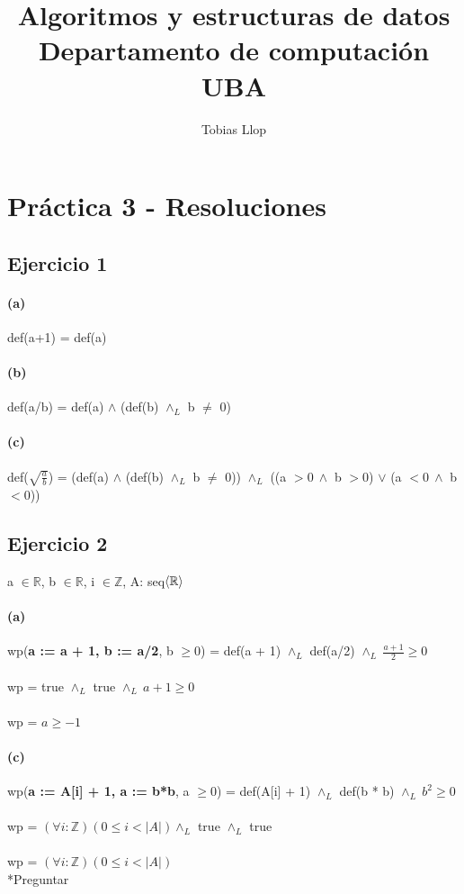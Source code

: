 \documentclass{article}
\title{Algoritmos y estructuras de datos
       \\ Departamento de computación UBA}
\author{Tobias Llop}
\date{}
\begin{document}
\maketitle
\setcounter{section}{2}
\section{Práctica 3 - Resoluciones}
\subsection{Ejercicio 1} 

\paragraph{(a)} def(a+1) = def(a)
\paragraph{(b)} def(a/b) = def(a) \(\land\) (def(b) \(\land_L\) b \(\neq\) 0) 
\paragraph{(c)} def(\( \sqrt{\frac{a}{b}}\)) = (def(a) \(\land\) (def(b) \(\land_L\) b \(\neq\) 0)) \( \land_L\) ((a \(>0 \: \land \) b \(>0\)) \( \lor \) (a \(<0 \: \land \) b \(<0\)))

\subsection{Ejercicio 2}
a \(\in \mathbb{R}\), b \(\in \mathbb{R}\), i \(\in \mathbb{Z}\), A: seq\(\braket{\mathbb{R}}\) 

\paragraph{(a)} wp(\textbf{a := a + 1, b := a/2}, b \(\geq 0 \)) = def(a + 1) \(\land_L\) def(a/2)  \(\land_L \: \frac{a+1}{2} \geq 0\) \\ \\
\setlength{\parindent}{59mm}\indent wp =  true \(\land_L\) true \(\land_L \: a+1 \geq 0\) \\ \\
\setlength{\parindent}{59mm}\indent wp = \( a \geq -1\)

\paragraph{(c)} wp(\textbf{a := A[i] + 1, a := b*b}, a \(\geq 0 \)) = def(A[i] + 1) \(\land_L\) def(b * b)  \(\land_L \: b^2 \geq 0\) \\ \\
\setlength{\parindent}{59mm}\indent wp = \((\forall i:\mathbb{Z})(0 \leq i < |A| )   \land_L\) true \(\land_L\) true \\ \\
\setlength{\parindent}{59mm}\indent wp = \((\forall i:\mathbb{Z})(0 \leq i < |A| )\)
\\ *Preguntar
\end{document}
